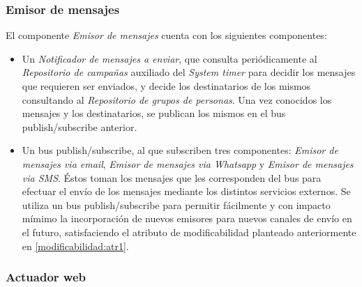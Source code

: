 \documentclass[a4paper, 10pt, twoside]{article}
\begin{document}
\subsubsection{Emisor de mensajes}

El componente \textit{Emisor de mensajes} cuenta con los siguientes componentes:

\begin{itemize}
  \item Un \textit{Notificador de mensajes a enviar}, que consulta periódicamente al \textit{Repositorio de campañas} auxiliado del \textit{System timer} para decidir los mensajes que requieren ser enviados, y decide los destinatarios de los mismos consultando al \textit{Repositorio de grupos de personas}. Una vez conocidos los mensajes y los destinatarios, se publican los mismos en el bus publish/subscribe anterior.

  \item Un bus publish/subscribe, al que subscriben tres componentes: \textit{Emisor de mensajes via email}, \textit{Emisor de mensajes via Whatsapp} y \textit{Emisor de mensajes via SMS}. Éstos toman los mensajes que les corresponden del bus para efectuar el envío de los mensajes mediante los distintos servicios externos. Se utiliza un bus publish/subscribe para permitir fácilmente y con impacto mímimo la incorporación de nuevos emisores para nuevos canales de envío en el futuro, satisfaciendo el atributo de modificabilidad planteado anteriormente en \ref{modificabilidad:atr1}.
\end{itemize}

\subsubsection{Actuador web}
\end{document}
